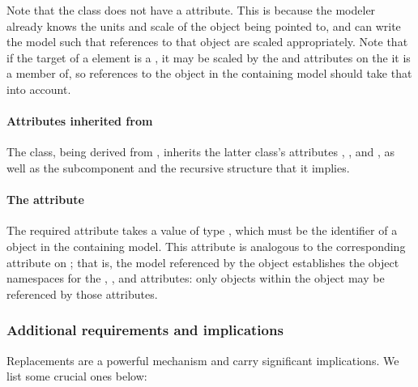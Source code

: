 Note that the \ReplacedBy class does not have a 
attribute.  This is because the modeler already knows the units
and scale of the object being pointed to, and can write the model such that 
references to that object are scaled appropriately.  Note that if the target
of a \ReplacedBy element is a \Reaction, it may be scaled by the
 and  attributes
on the \Submodel it is a member of, so references to the object in the
containing model should take that into account.

\paragraph{Attributes inherited from }

The \ReplacedBy class, being derived from \SBaseRef, inherits the latter
class's attributes , ,  and
, as well as the subcomponent  and the
recursive structure that it implies.  


\paragraph{The \fixttspace{} attribute}
\label{replacedby-submodelref}

The required attribute  takes a value of type
, which must be the identifier of a \Submodel object in
the containing model.  This attribute is analogous to the corresponding
attribute on \ReplacedElement; that is, the model referenced by the
\Submodel object establishes the object namespaces for the
, ,  and 
attributes: only objects within the \Model object may be referenced by
those attributes.


\subsubsection{Additional requirements and implications}
\label{replacedelement-additional}

Replacements are a powerful mechanism and carry significant
implications.  We list some crucial ones below:


